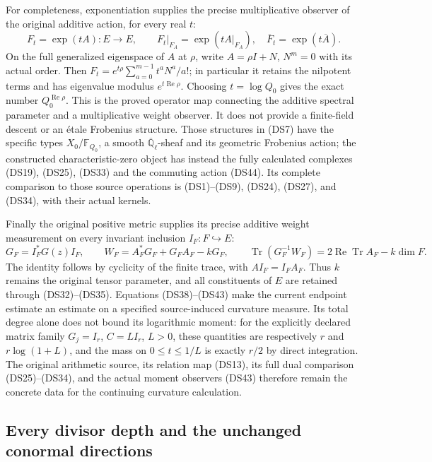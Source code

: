 For completeness, exponentiation supplies the precise multiplicative
observer of the original additive action, for every real $t$:
\[
 F_t=\exp(tA):E\to E,\qquad
 F_t|_{F_A}=\exp(tA|_{F_A}),\quad
 \overline F_t=\exp(t\overline A).
 \tag{DS44}
\]
On the full generalized eigenspace of $A$ at $\rho$, write
$A=\rho I+N$, $N^m=0$ with its actual order.  Then
$F_t=e^{t\rho}\sum_{a=0}^{m-1}t^aN^a/a!$; in particular it
retains the nilpotent terms and has eigenvalue modulus
$e^{t\operatorname{Re}\rho}$.  Choosing $t=\log Q_0$ gives the exact
number $Q_0^{\operatorname{Re}\rho}$.  This is the proved operator
map connecting the additive spectral parameter and a multiplicative
weight observer.  It does not provide a finite-field descent or an
\'{e}tale Frobenius structure.  Those structures in (DS7) have the
specific types $X_0/\mathbb F_{Q_0}$, a smooth
$\overline{\mathbb Q}_\ell$-sheaf and its geometric Frobenius action;
the constructed characteristic-zero object has instead the fully
calculated complexes (DS19), (DS25), (DS33) and the commuting action
(DS44).  Its complete comparison to those source operations is
(DS1)--(DS9), (DS24), (DS27), and (DS34), with their actual kernels.

Finally the original positive metric supplies its precise additive
weight measurement on every invariant inclusion $I_F:F\hookrightarrow E$:
\[
 G_F=I_F^*G(z)I_F,\qquad
 W_F=A_F^*G_F+G_FA_F-kG_F,
 \qquad
 \operatorname{Tr}(G_F^{-1}W_F)=
 2\operatorname{Re}\operatorname{Tr}A_F-k\dim F.
 \tag{DS45}
\]
The identity follows by cyclicity of the finite trace, with
$AI_F=I_FA_F$.  Thus $k$ remains the original tensor parameter,
and all constituents of $E$ are retained through (DS32)--(DS35).
Equations (DS38)--(DS43) make the current endpoint estimate an
estimate on a specified source-induced curvature measure.  Its total
degree alone does not bound its logarithmic moment: for the explicitly
declared matrix family $G_j=I_r$, $C=LI_r$, $L>0$, these quantities
are respectively $r$ and $r\log(1+L)$, and the mass on
$0\leq t\leq1/L$ is exactly $r/2$ by direct integration.
The original arithmetic source, its relation map (DS13), its full
dual comparison (DS25)--(DS34), and the actual moment observers
(DS43) therefore remain the concrete data for the continuing
curvature calculation.

\subsection{Every divisor depth and the unchanged conormal directions}

